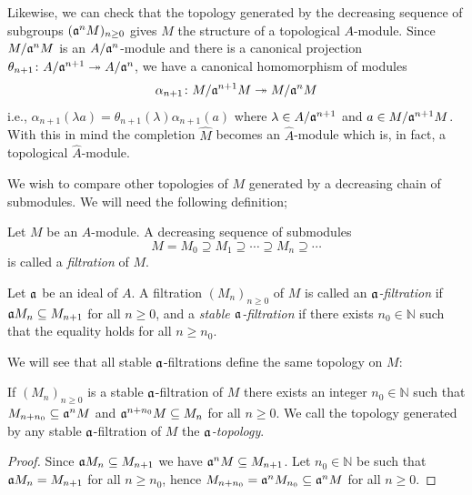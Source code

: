 Likewise, we can check that the topology generated by the decreasing sequence of subgroups $(\mathfrak{a}^nM)_{n\geq 0}$ gives $M$ the structure of a topological $A$-module. Since $M/\mathfrak{a}^nM$ is an $A/\mathfrak{a}^n$-module and there is a canonical projection $\theta_{n+1}\colon A/\mathfrak{a}^{n+1}\twoheadrightarrow A/\mathfrak{a}^n$, we have a canonical homomorphism of modules
\[
\alpha_{n+1}\colon M/\mathfrak{a}^{n+1}M \twoheadrightarrow M/\mathfrak{a}^nM
\]
i.e., $\alpha_{n+1}(\lambda a)=\theta_{n+1}(\lambda)\alpha_{n+1}(a)$ where $\lambda\in A/\mathfrak{a}^{n+1}$ and $a\in M/\mathfrak{a}^{n+1}M$. With this in mind the completion $\hat M$ becomes an $\hat A$-module which is, in fact, a topological $\hat A$-module.

We wish to compare other topologies of $M$ generated by a decreasing chain of submodules. We will need the following definition;


\begin{defi}
    Let $M$ be an $A$-module. A decreasing sequence of submodules
    \[
    M=M_0\supseteq M_1\supseteq \cdots\supseteq M_n\supseteq \cdots
    \]
    is called a \emph{filtration} of $M$. 
    
    Let $\mathfrak{a}$ be an ideal of $A$. A filtration $(M_n)_{n\geq 0}$ of $M$ is called an \emph{$\mathfrak{a}$-filtration} if $\mathfrak{a} M_n\subseteq M_{n+1}$ for all $n\geq 0$, and a \emph{stable $\mathfrak{a}$-filtration} if there exists $n_0\in\mathbb N$ such that the equality holds for all $n\geq n_0$. 
\end{defi}

We will see that all stable $\mathfrak{a}$-filtrations define the same topology on $M$:
\begin{lem}
    If $(M_n)_{n\geq 0}$ is a stable $\mathfrak{a}$-filtration of $M$ there exists an integer $n_0\in\mathbb N$ such that $M_{n+n_0}\subseteq \mathfrak{a}^nM$ and $\mathfrak{a}^{n+n_0}M\subseteq M_n$ for all $n\geq 0$. We call the topology generated by any stable $\mathfrak{a}$-filtration of $M$ the \emph{$\mathfrak{a}$-topology}.
\end{lem}
\begin{proof}
    Since $\mathfrak{a} M_n\subseteq M_{n+1}$ we have $\mathfrak{a}^nM\subseteq M_{n+1}$. Let $n_0\in \mathbb N$ be such that $\mathfrak{a} M_n=M_{n+1}$ for all $n\geq n_0$, hence $M_{n+n_0}=\mathfrak{a}^n M_{n_0}\subseteq \mathfrak{a}^n M$ for all $n\geq 0$.
\end{proof}